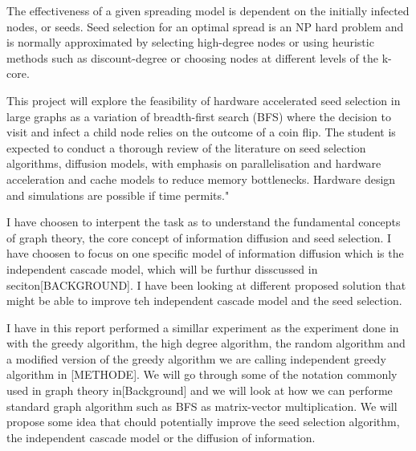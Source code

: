 The effectiveness of a given spreading model is dependent on the initially infected nodes, or seeds. Seed selection for an optimal spread is an NP hard problem and is normally approximated by selecting high-degree nodes or using heuristic methods such as discount-degree or choosing nodes at different levels of the k-core.

This project will explore the feasibility of hardware accelerated seed selection in large graphs as a variation of breadth-first search (BFS) where the decision to visit and infect a child node relies on the outcome of a coin flip. The student is expected to conduct a thorough review of the literature on seed selection algorithms, diffusion models, with emphasis on parallelisation and hardware acceleration and cache models to reduce memory bottlenecks. Hardware design and simulations are possible if time permits."

I have choosen to interpent the task as to understand the fundamental concepts of graph theory, the core concept of information diffusion and seed selection. I have choosen to focus on one specific model of information diffusion which is the independent cascade model, which will be furthur disscussed in seciton[BACKGROUND]. I have been looking at different proposed solution that might be able to improve teh independent cascade model and the seed selection.

I have in this report performed a simillar experiment as the experiment done in \cite{Maximizespread2003} with the greedy algorithm, the high degree algorithm, the random algorithm and a modified version of the greedy algorithm we are calling independent greedy algorithm in [METHODE]. We will go through some of the notation commonly used in graph theory in[Background] and we will look at how we can performe standard graph algorithm such as BFS as matrix-vector multiplication. We will propose some idea that chould potentially improve the seed selection algorithm, the independent cascade model or the diffusion of information. 

